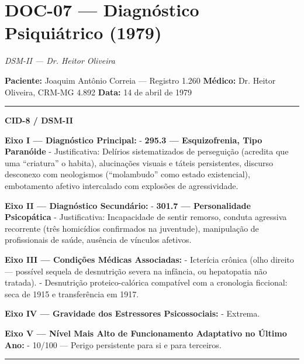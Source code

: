 \section*{\textbf{DOC-07} --- Diagnóstico Psiquiátrico (1979)}

\noindent \textit{DSM-II --- Dr. Heitor Oliveira}

\noindent \textbf{Paciente:} Joaquim Antônio Correia --- Registro 1.260
\textbf{Médico:} Dr. Heitor Oliveira, CRM-MG 4.892
\textbf{Data:} 14 de abril de 1979

\vspace{0.5em}\noindent\rule{\textwidth}{0.5pt}\vspace{0.5em}

\noindent \textbf{CID-8 / DSM-II}

\noindent \textbf{Eixo I --- Diagnóstico Principal:}
- \textbf{295.3 --- Esquizofrenia, Tipo Paranóide}
  - Justificativa: Delírios sistematizados de perseguição (acredita que uma \textquotedblleft{}criatura\textquotedblright{} o habita), alucinações visuais e táteis persistentes, discurso desconexo com neologismos (\textquotedblleft{}molambudo\textquotedblright{} como estado existencial), embotamento afetivo intercalado com explosões de agressividade.

\noindent \textbf{Eixo II --- Diagnóstico Secundário:}
- \textbf{301.7 --- Personalidade Psicopática}
  - Justificativa: Incapacidade de sentir remorso, conduta agressiva recorrente (três homicídios confirmados na juventude), manipulação de profissionais de saúde, ausência de vínculos afetivos.

\noindent \textbf{Eixo III --- Condições Médicas Associadas:}
- Icterícia crônica (olho direito --- possível sequela de desnutrição severa na infância, ou hepatopatia não tratada).
- Desnutrição proteico-calórica compatível com a cronologia ficcional: seca de 1915 e transferência em 1917.

\noindent \textbf{Eixo IV --- Gravidade dos Estressores Psicossociais:}
- Extrema.

\noindent \textbf{Eixo V --- Nível Mais Alto de Funcionamento Adaptativo no Último Ano:}
- 10/100 --- Perigo persistente para si e para terceiros.

\vspace{0.5em}\noindent\rule{\textwidth}{0.5pt}\vspace{0.5em}

